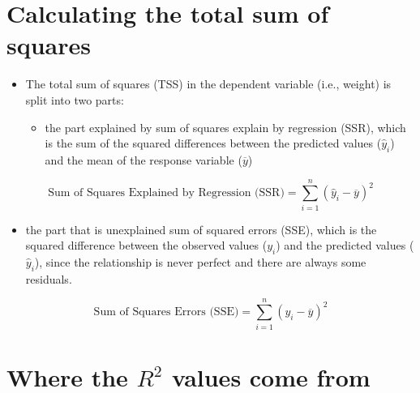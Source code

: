 \documentclass[
]{article}
\providecommand{\tightlist}{%
  \setlength{\itemsep}{0pt}\setlength{\parskip}{0pt}}
\begin{document}
\hypertarget{calculating-the-total-sum-of-squares}{%
\section{Calculating the total sum of
squares}\label{calculating-the-total-sum-of-squares}}

\begin{itemize}
\tightlist
\item
  The total sum of squares (TSS) in the dependent variable (i.e.,
  weight) is split into two parts:

  \begin{itemize}
  \tightlist
  \item
    the part explained by sum of squares explain by regression (SSR),
    which is the sum of the squared differences between the predicted
    values (\(\hat{y}_{i}\)) and the mean of the response variable
    (\(\overline{y}\))
  \end{itemize}
\end{itemize}

\[\text{Sum of Squares Explained by Regression (SSR)} = \sum_{i=1}^{n} (\hat{y}_{i} - \overline{y})^2\]

\begin{itemize}
\tightlist
\item
  the part that is unexplained sum of squared errors (SSE), which is the
  squared difference between the observed values (\(y_{i}\)) and the
  predicted values (\(\hat{y}_{i}\)), since the relationship is never
  perfect and there are always some residuals.
\end{itemize}

\[\text{Sum of Squares Errors (SSE)} = \sum_{i=1}^{n} (y_{i} - \overline{y})^2\]

\hypertarget{where-the-r2-values-come-from}{%
\section{\texorpdfstring{Where the \(R^2\) values come
from}{Where the R\^{}2 values come from}}\label{where-the-r2-values-come-from}}
\end{document}

